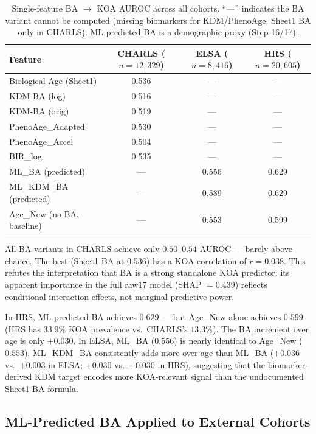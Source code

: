 \documentclass[11pt,a4paper]{article}
\begin{document}
\begin{table}[h!]
\centering
\small
\caption{Single-feature BA $\rightarrow$ KOA AUROC across all cohorts. ``---'' indicates
the BA variant cannot be computed (missing biomarkers for KDM/PhenoAge; Sheet1 BA only
in CHARLS). ML-predicted BA is a demographic proxy (Step 16/17).}
\label{tab:single-feature}
\begin{tabular}{lccc}
\toprule
Feature & CHARLS ($n{=}12{,}329$) & ELSA ($n{=}8{,}416$) & HRS ($n{=}20{,}605$) \\
\midrule
Biological Age (Sheet1)        & 0.536 & --- & --- \\
KDM-BA (log)                   & 0.516 & --- & --- \\
KDM-BA (orig)                  & 0.519 & --- & --- \\
PhenoAge\_Adapted              & 0.530 & --- & --- \\
PhenoAge\_Accel                & 0.504 & --- & --- \\
BIR\_log                       & 0.535 & --- & --- \\
ML\_BA (predicted)             & ---   & 0.556 & 0.629 \\
ML\_KDM\_BA (predicted)        & ---   & 0.589 & 0.629 \\
Age\_New (no BA, baseline)     & ---   & 0.553 & 0.599 \\
\bottomrule
\end{tabular}
\end{table}

All BA variants in CHARLS achieve only $0.50$--$0.54$ AUROC --- barely above chance.
The best (Sheet1 BA at $0.536$) has a KOA correlation of $r=0.038$.
This refutes the interpretation that BA is a strong standalone KOA predictor: its apparent importance in the full raw17 model (SHAP $=0.439$)
 reflects conditional interaction effects, not marginal predictive power.

In HRS, ML-predicted BA achieves $0.629$ --- but Age\_New alone achieves $0.599$ (HRS has
$33.9\%$ KOA prevalence vs.\ CHARLS's $13.3\%$). The BA increment over age is only
$+0.030$. In ELSA, ML\_BA ($0.556$) is nearly identical to Age\_New ($0.553$).
ML\_KDM\_BA consistently adds more over age than ML\_BA ($+0.036$ vs.\ $+0.003$ in ELSA;
$+0.030$ vs.\ $+0.030$ in HRS), suggesting that the biomarker-derived KDM target encodes
more KOA-relevant signal than the undocumented Sheet1 BA formula.

\subsection{ML-Predicted BA Applied to External Cohorts}
\label{sec:results-ml-ba-external}
\end{document}
